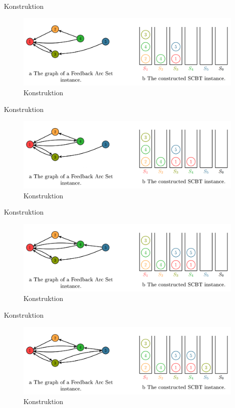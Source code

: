 \documentclass{beamer}
\begin{document}
\begin{frame}{Konstruktion}
\begin{figure}[ht]
		\includegraphics[width=\textwidth]{construct04}
		\caption{Konstruktion}
    \end{figure}
\end{frame}

\begin{frame}{Konstruktion}
\begin{figure}[ht]
		\includegraphics[width=\textwidth]{construct03}
		\caption{Konstruktion}
    \end{figure}
\end{frame}

\begin{frame}{Konstruktion}
\begin{figure}[ht]
		\includegraphics[width=\textwidth]{construct02}
		\caption{Konstruktion}
    \end{figure}
\end{frame}

\begin{frame}{Konstruktion}
\begin{figure}[ht]
		\includegraphics[width=\textwidth]{construct01}
		\caption{Konstruktion}
    \end{figure}
\end{frame}
\end{document}
